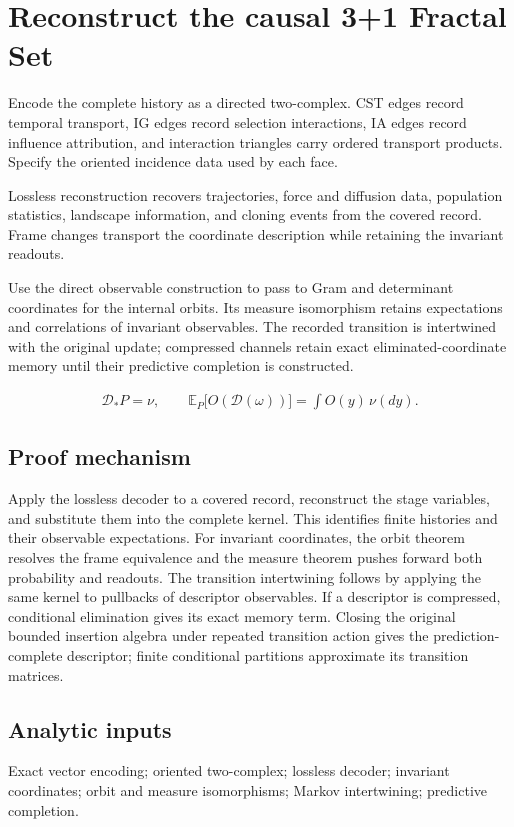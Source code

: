 \documentclass[11pt,a4paper]{article}
\begin{document}
\section{Reconstruct the causal 3+1 Fractal Set}
\label{stage:10}
Encode the complete history as a directed two-complex. CST edges record temporal transport, IG edges record selection interactions, IA edges record influence attribution, and interaction triangles carry ordered transport products. Specify the oriented incidence data used by each face.

Lossless reconstruction recovers trajectories, force and diffusion data, population statistics, landscape information, and cloning events from the covered record. Frame changes transport the coordinate description while retaining the invariant readouts.

Use the direct observable construction to pass to Gram and determinant coordinates for the internal orbits. Its measure isomorphism retains expectations and correlations of invariant observables. The recorded transition is intertwined with the original update; compressed channels retain exact eliminated-coordinate memory until their predictive completion is constructed.


\begin{gather*}
\mathscr D_*P=\nu,\qquad
\mathbb E_P\bigl[O(\mathscr D(\omega))\bigr]=\int O(y)\,\nu(dy).
\end{gather*}
\subsection*{Proof mechanism}
Apply the lossless decoder to a covered record, reconstruct the stage variables, and substitute them into the complete kernel. This identifies finite histories and their observable expectations. For invariant coordinates, the orbit theorem resolves the frame equivalence and the measure theorem pushes forward both probability and readouts. The transition intertwining follows by applying the same kernel to pullbacks of descriptor observables. If a descriptor is compressed, conditional elimination gives its exact memory term. Closing the original bounded insertion algebra under repeated transition action gives the prediction-complete descriptor; finite conditional partitions approximate its transition matrices.
\subsection*{Analytic inputs}
Exact vector encoding; oriented two-complex; lossless decoder; invariant coordinates; orbit and measure isomorphisms; Markov intertwining; predictive completion.
\end{document}
